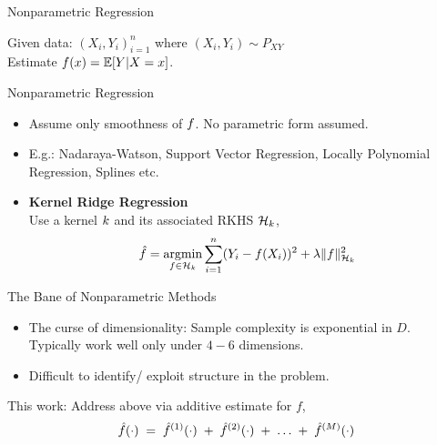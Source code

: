 
\begin{frame}{Nonparametric Regression}

  Given data: $(X_i, Y_i)_{i=1}^n$ \hspace{0.1in} where $(X_i,Y_i)\sim P_{XY}$ \\ 
  Estimate $f(x) = \mathbb{E}[Y| X=x]$.
  \vspace{0.1in}

  Nonparametric Regression
  \begin{itemize}
    \item Assume only smoothness of $f$. No parametric form assumed.
    \item E.g.: Nadaraya-Watson, Support Vector Regression, Locally Polynomial
          Regression, Splines etc.
    \vspace{0.15in}
    \pause
    \item \textbf{Kernel Ridge Regression} \\
      Use a kernel $k$ and its associated RKHS ${\mathcal{H}_{k}}$,
      \[ \hat{f} = \mathop{\mathrm{argmin}}_{f\in {\mathcal{H}_{k}}} \sum_{i=1}^n (Y_i - f(X_i))^2 
          + \lambda \|f\|^2_{{\mathcal{H}_{k}}}
      \]
  \end{itemize}

\end{frame}

\begin{frame}{The Bane of Nonparametric Methods}

  \begin{itemize}
    \item The curse of dimensionality: Sample complexity is exponential in $D$.
          Typically work well only under $4-6$ dimensions.
    \item Difficult to identify/ exploit  structure in the problem.
  \end{itemize}
  \vspace{0.4in}

  This work: Address above via additive estimate for $f$,
  \[
    \hat{f}(\cdot) \;=\; \hat{f}^{(1)}(\cdot)\; +\;  
      \hat{f}^{(2)}(\cdot)\;+\;\dots \;+\; \hat{f}^{(M)}(\cdot)
  \]
\end{frame}



